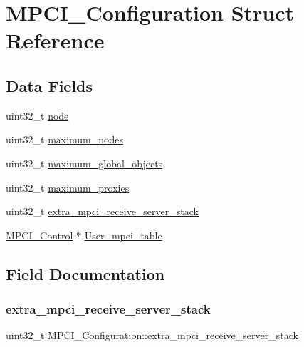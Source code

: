 \hypertarget{structMPCI__Configuration}{}\section{M\+P\+C\+I\+\_\+\+Configuration Struct Reference}
\label{structMPCI__Configuration}
\subsection*{Data Fields}
\begin{DoxyCompactItemize}
\item 
uint32\+\_\+t \mbox{\hyperlink{structMPCI__Configuration_a28038b346b3287c353708e0770f818a8}{node}}
\item 
uint32\+\_\+t \mbox{\hyperlink{structMPCI__Configuration_a9e2813315e96f6de6ea2876e29749908}{maximum\+\_\+nodes}}
\item 
uint32\+\_\+t \mbox{\hyperlink{structMPCI__Configuration_ab8e64dde4b8270e5119d9c09d87e352e}{maximum\+\_\+global\+\_\+objects}}
\item 
uint32\+\_\+t \mbox{\hyperlink{structMPCI__Configuration_a884083fa1462f85fbe5f1a8f88c9659d}{maximum\+\_\+proxies}}
\item 
uint32\+\_\+t \mbox{\hyperlink{structMPCI__Configuration_a66cf7127966572aaa4a96a09158cd732}{extra\+\_\+mpci\+\_\+receive\+\_\+server\+\_\+stack}}
\item 
\mbox{\hyperlink{structMPCI__Control}{M\+P\+C\+I\+\_\+\+Control}} $\ast$ \mbox{\hyperlink{structMPCI__Configuration_a4ac9a792a717230de2e1f48de18e0bb6}{User\+\_\+mpci\+\_\+table}}
\end{DoxyCompactItemize}


\subsection{Field Documentation}
\mbox{\label{structMPCI__Configuration_a66cf7127966572aaa4a96a09158cd732}} 
\subsubsection{\texorpdfstring{extra\_mpci\_receive\_server\_stack}{extra\_mpci\_receive\_server\_stack}}
{\footnotesize\ttfamily uint32\+\_\+t M\+P\+C\+I\+\_\+\+Configuration\+::extra\+\_\+mpci\+\_\+receive\+\_\+server\+\_\+stack}

